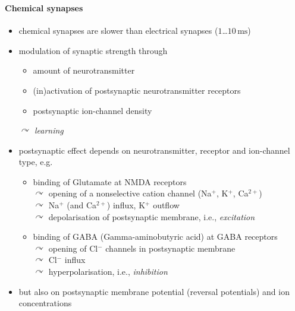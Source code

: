 \documentclass[8pt,t,usepdftitle=false]{beamer}
\begin{document}
\begin{frame}[plain]
  \frametitle{\ttl}
  \framesubtitle{Chemical synapses}
  \begin{itemize}\itemsep1ex
  \item<1-> chemical synapses are slower than electrical synapses ($1$\ldots$10\,\text{ms}$)
  \item<1-> modulation of synaptic strength through
    \begin{itemize}\itemsep1ex
    \item amount of neurotransmitter
    \item (in)activation of postsynaptic neurotransmitter receptors
    \item postsynaptic ion-channel density
    \end{itemize}
    $\curvearrowright$ \emph{learning}
  \item<2-> postsynaptic effect depends on neurotransmitter, receptor and 
    ion-channel type, e.g.
    \begin{itemize}\itemsep1ex
    \item binding of Glutamate at NMDA receptors\\
      $\curvearrowright$ opening of a nonselective cation channel
      (Na$^+$, K$^+$, Ca$^{2+}$)\\
      $\curvearrowright$ Na$^+$ (and Ca$^{2+}$) influx, K$^+$ outflow\\
      $\curvearrowright$ depolarisation of postsynaptic membrane, 
      i.e., \emph{excitation}
    \item binding of GABA (Gamma-aminobutyric acid) at GABA receptors\\
      $\curvearrowright$ opening of Cl$^-$ channels in postsynaptic membrane\\
      $\curvearrowright$ Cl$^-$ influx\\
      $\curvearrowright$ hyperpolarisation, i.e., \emph{inhibition}
    \end{itemize}
  \item<3->[]but also on postsynaptic membrane potential (reversal potentials) 
    and ion concentrations
  \end{itemize}
\end{frame}
\end{document}
